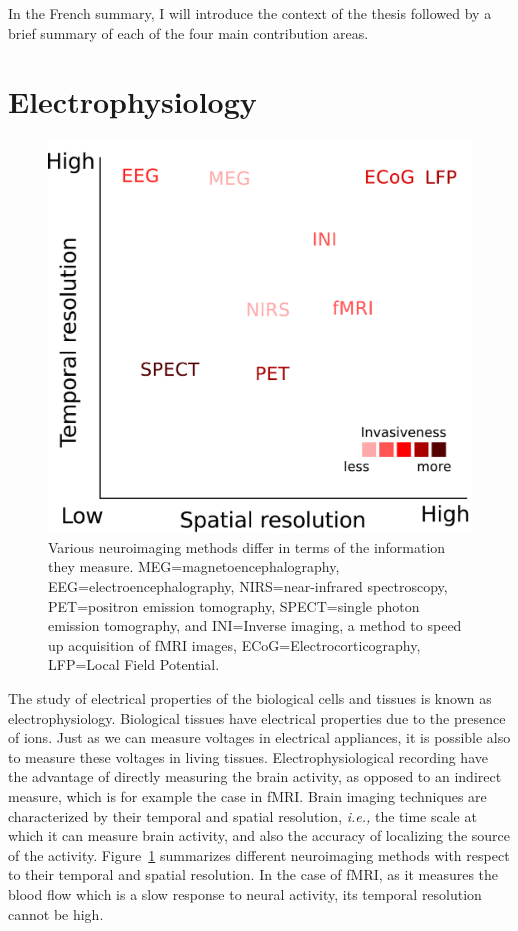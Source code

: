 In the French summary, I will introduce the context of the thesis followed by a brief summary of each of the four main contribution areas.

\section*{Electrophysiology}

\begin{figure}[htb]
\begin{center}
   \includegraphics[width=0.6\linewidth]{figures/neuroimaging_methods.pdf}
\end{center}
   \caption[Various neuroimaging methods differ in terms of the information they measure.]{Various neuroimaging methods differ in terms of the information they measure. MEG=magnetoencephalography, EEG=electroencephalography, NIRS=near-infrared spectroscopy, PET=positron emission tomography, SPECT=single photon emission tomography, and INI=Inverse imaging, a method to speed up acquisition of fMRI images, ECoG=Electrocorticography, LFP=Local Field Potential.}
   \label{fig:sommaire:neuroimaging_methods}
\end{figure}

The study of electrical properties of the biological cells and tissues is known as electrophysiology. 
Biological tissues have electrical properties due to the presence of ions. Just as we can measure voltages in electrical appliances, it is possible also to measure these voltages in living tissues. 
Electrophysiological recording have the advantage of directly measuring the brain activity, as opposed to an indirect measure, which is for example the case in \ac{fMRI}.
Brain imaging techniques are characterized by their temporal and spatial resolution, \textit{i.e.,} the time scale at which it can measure brain activity, and also the accuracy of localizing the source of the activity. Figure~\ref{fig:sommaire:neuroimaging_methods} summarizes different neuroimaging methods with respect to their temporal and spatial resolution. In the case of \ac{fMRI}, as it measures the blood flow which is a slow response to neural activity, its temporal resolution cannot be high. 

